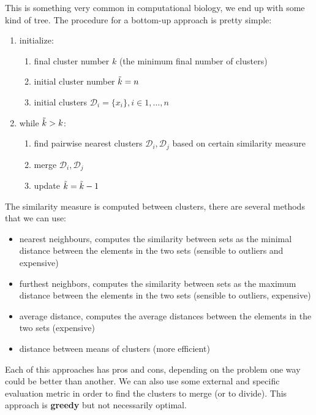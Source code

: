         This is something very common in computational biology, we end up with some kind of tree.
        The procedure for a bottom-up approach is pretty simple:
        \begin{enumerate}
            \item initialize:
            \begin{enumerate}
                \item final cluster number $k$ (the minimum final number of clusters)
                \item initial cluster number $\Tilde{k} = n$
                \item initial clusters $\mathcal{D}_i = \{ x_i \}, i \in 1, \dots, n$
            \end{enumerate}
            \item while $\Tilde{k} > k$:
            \begin{enumerate}
                \item find pairwise nearest clusters $\mathcal{D}_i, \mathcal{D}_j$ based on certain similarity measure
                \item merge $\mathcal{D}_i, \mathcal{D}_j$
                \item update $\Tilde{k} = \Tilde{k} - 1$
            \end{enumerate}
        \end{enumerate}

        The similarity measure is computed between clusters, there are several methods that we can use:
        \begin{itemize}
            \item nearest neighbours, computes the similarity between sets as the minimal distance between the elements in the two sets (sensible to outliers and expensive)
            \item furthest neighbors, computes the similarity between sets as the maximum distance between the elements in the two sets (sensible to outliers, expensive)
            \item average distance, computes the average distances between the elements in the two sets (expensive)
            \item distance between means of clusters (more efficient)
        \end{itemize}
        Each of this approaches has pros and cons, depending on the problem one way could be better than another. 
        We can also use some external and specific evaluation metric in order to find the clusters to merge (or to divide).
        This approach is \textbf{greedy} but not necessarily optimal. 